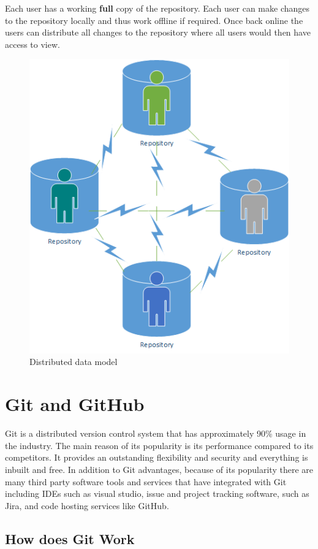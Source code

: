 \documentclass[
]{book}
\begin{document}
Each user has a working \textbf{full} copy of the repository. Each user can make changes to the repository locally and thus work offline if required. Once back online the users can distribute all changes to the repository where all users would then have access to view.\\

\begin{figure}

{\centering \includegraphics[width=0.6\linewidth]{images/Distributed Data Model Example} 

}

\caption{Distributed data model}\label{fig:unnamed-chunk-4}
\end{figure}

\hypertarget{git-and-github}{%
\section{Git and GitHub}\label{git-and-github}}

Git is a distributed version control system that has approximately 90\% usage in the industry. The main reason of its popularity is its performance compared to its competitors. It provides an outstanding flexibility and security and everything is inbuilt and free.
In addition to Git advantages, because of its popularity there are many third party software tools and services that have integrated with Git including IDEs such as visual studio, issue and project tracking software, such as Jira, and code hosting services like GitHub.

\hypertarget{how-does-git-work}{%
\subsection{How does Git Work}\label{how-does-git-work}}
\end{document}
